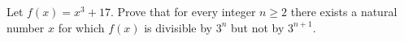 Let $f(x)=x^3+17$. Prove that for every integer $n\ge 2$ there exists a natural number $x$ for which $f(x)$ is divisible by $3^n$ but not by $3^{n+1}$.
